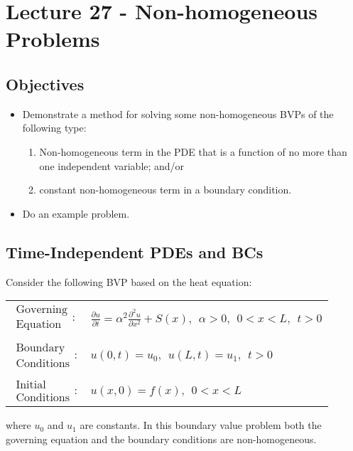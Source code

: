 \chapter{Lecture 27 - Non-homogeneous Problems}
\label{ch:lec27}
\section{Objectives}
\begin{itemize}
\item Demonstrate a method for solving some non-homogeneous BVPs of the following type:
\begin{enumerate}
\item Non-homogeneous term in the PDE that is a function of no more than one independent variable; and/or
\item constant non-homogeneous term in a boundary condition.
\end{enumerate}
\item Do an example problem.
\end{itemize}
\setcounter{lstannotation}{0} %

\section{Time-Independent PDEs and BCs}
Consider the following BVP based on the heat equation:
\begin{table}
\begin{tabular}{l l}
$\substack{\text{Governing} \\\text{Equation}}: $& $\frac{\partial u}{\partial t} = \alpha^2 \frac{\partial^2 u}{\partial x^2} + S(x), \ \ \alpha>0, \ \ 0<x<L, \ \ t>0$ \\
& \\
$\substack{\text{Boundary} \\ \text{Conditions}}: $& $u(0,t)=u_0, \ \ u(L,t) = u_1, \ \ t>0$\\
& \\
$\substack{\text{Initial} \\ \text{Conditions}}: $ & $u(x,0) = f(x), \ \ 0<x<L $ \\
\end{tabular}
\end{table}
where $u_0$ and $u_1$ are constants.  In this boundary value problem both the governing equation and the boundary conditions are non-homogeneous.  

